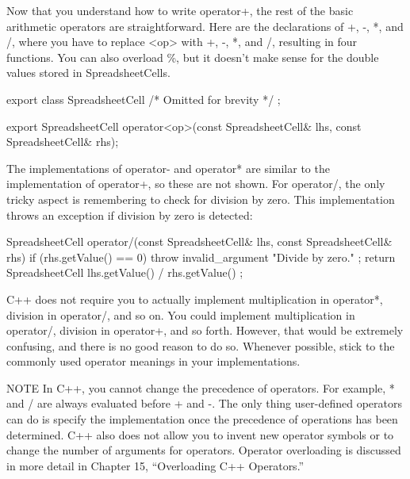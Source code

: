 
Now that you understand how to write operator+, the rest of the basic arithmetic operators are straightforward. Here are the declarations of +, -, *, and /, where you have to replace <op> with +, -, *, and /, resulting in four functions. You can also overload \%, but it doesn’t make sense for the double values stored in SpreadsheetCells.

\begin{cpp}
export class SpreadsheetCell { /* Omitted for brevity */ };

export SpreadsheetCell operator<op>(const SpreadsheetCell& lhs,
    const SpreadsheetCell& rhs);
\end{cpp}

The implementations of operator- and operator* are similar to the implementation of operator+, so these are not shown. For operator/, the only tricky aspect is remembering to check for division by zero. This implementation throws an exception if division by zero is detected:

\begin{cpp}
SpreadsheetCell operator/(const SpreadsheetCell& lhs,
    const SpreadsheetCell& rhs)
{
    if (rhs.getValue() == 0) {
        throw invalid_argument { "Divide by zero." };
    }
    return SpreadsheetCell { lhs.getValue() / rhs.getValue() };
}
\end{cpp}

C++ does not require you to actually implement multiplication in operator*, division in operator/, and so on. You could implement multiplication in operator/, division in operator+, and so forth. However, that would be extremely confusing, and there is no good reason to do so. Whenever possible, stick to the commonly used operator meanings in your implementations.

\begin{myNotic}{NOTE}
In C++, you cannot change the precedence of operators. For example, * and / are always evaluated before + and -. The only thing user-defined operators can do is specify the implementation once the precedence of operations has been determined. C++ also does not allow you to invent new operator symbols or to change the number of arguments for operators. Operator overloading is discussed in more detail in Chapter 15, “Overloading C++ Operators.”
\end{myNotic}


